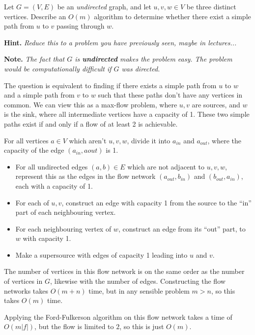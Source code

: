\documentclass{article}
\begin{document}
\begin{question}
Let $G = (V, E)$ be an {\em undirected} graph, and let $u, v, w \in V$ be three distinct vertices. Describe an $O(m)$ algorithm to determine whether there exist a simple path from $u$ to $v$ passing through $w$.

{\bfseries Hint.} {\em Reduce this to a problem you have previously seen, maybe in lectures...}

{\bfseries Note.} {\em The fact that $G$ is {\bfseries undirected} makes the problem easy. The problem would be computationally difficult if $G$ was directed.}
\end{question}

\begin{solution}
    The question is equivalent to finding if there exists a simple path from $u$ to $w$ and a 
    simple path from $v$ to $w$ such that these paths don't have any vertices in common.
    We can view this as a max-flow problem, where $u, v$ are sources, and $w$ is the sink, 
    where all intermediate vertices have a capacity of 1. These two simple paths exist if and only if 
    a flow of at least 2 is achievable.

    For all vertices $a\in V$ which aren't $u,v,w$, divide it into $a_{in}$ and $a_{out}$, 
    where the capacity of the edge $(a_{in}, a{out})$ is 1.
    \begin{itemize}
    \item For all undirected edges $(a,b)\in E$ which are not adjacent to $u,v,w$,
    represent this as the edges in the flow network $(a_{out}, b_{in})$ and $(b_{out}, a_{in})$,
    each with a capacity of 1. 
    \item For each of $u,v$, construct an edge with capacity 1 
    from the source to the ``in'' part of each neighbouring vertex. 
    \item For each neighbouring vertex of $w$, 
    construct an edge from its ``out'' part, to $w$ with capacity 1.
    \item Make a supersource with edges of capacity 1 leading into $u$ and $v$.
    \end{itemize}

    The number of vertices in this flow network is on the same order as the number of vertices in $G$,
    likewise with the number of edges. Constructing the flow networks takes $O(m + n)$ time, 
    but in any sensible problem $m > n$, so this takes $O(m)$ time.
    
    Applying the Ford-Fulkerson algorithm  on this flow network takes a time of $O(m|f|)$, 
    but the flow is limited to $2$, so this is just $O(m)$.
\end{solution}
\end{document}
